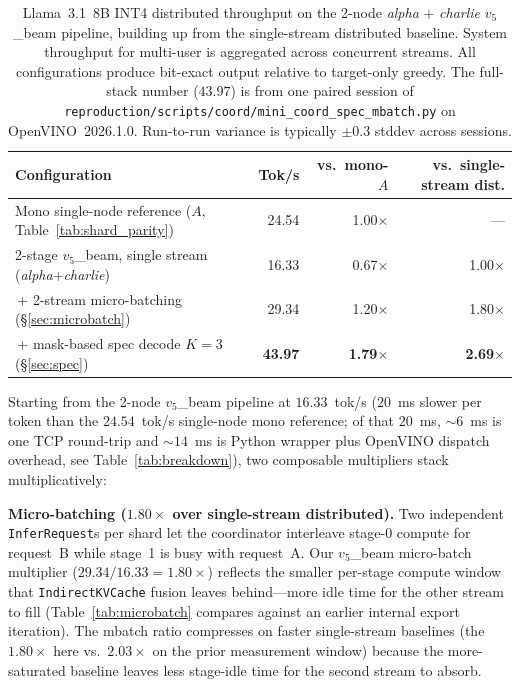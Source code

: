 \documentclass[11pt]{article}
\newcommand{\brk}{\discretionary{}{}{}}
\begin{document}
\begin{table}[ht]
\centering
\caption{Llama~3.1~8B INT4 distributed throughput on the 2-node \emph{alpha} + \emph{charlie} $v_5$\_beam pipeline, building up from the single-stream distributed baseline. System throughput for multi-user is aggregated across concurrent streams. All configurations produce bit-exact output relative to target-only greedy. The full-stack number ($43.97$) is from one paired session of \texttt{reproduction/\brk scripts/\brk coord/\brk mini\_\brk coord\_\brk spec\_\brk mbatch.py} on OpenVINO~2026.1.0. Run-to-run variance is typically $\pm 0.3$ stddev across sessions.}
\label{tab:progression}
\begin{tabular}{@{}lrrr@{}}
\toprule
Configuration & Tok/s & vs.\ mono-$A$ & vs.\ single-stream dist. \\
\midrule
Mono single-node reference ($A$, Table~\ref{tab:shard_parity}) & 24.54 & 1.00$\times$ & --- \\
2-stage $v_5$\_beam, single stream (\emph{alpha}+\emph{charlie}) & 16.33 & 0.67$\times$ & 1.00$\times$ \\
\,+ 2-stream micro-batching (\S\ref{sec:microbatch}) & 29.34 & 1.20$\times$ & 1.80$\times$ \\
\,+ mask-based spec decode $K\!=\!3$ (\S\ref{sec:spec}) & \textbf{43.97} & \textbf{1.79$\times$} & \textbf{2.69$\times$} \\
\bottomrule
\end{tabular}
\end{table}

Starting from the 2-node $v_5$\_beam pipeline at $16.33$~tok/s ($20$~ms slower per token than the $24.54$~tok/s single-node mono reference; of that $20$~ms, ${\sim}6$~ms is one TCP round-trip and ${\sim}14$~ms is Python wrapper plus OpenVINO dispatch overhead, see Table~\ref{tab:breakdown}), two composable multipliers stack multiplicatively:

\textbf{Micro-batching ($1.80\times$ over single-stream distributed).} Two independent \texttt{InferRequest}s per shard let the coordinator interleave stage-0 compute for request~B while stage~1 is busy with request~A. Our $v_5$\_beam micro-batch multiplier ($29.34 / 16.33 = 1.80\times$) reflects the smaller per-stage compute window that \texttt{Indirect\brk KVCache} fusion leaves behind---more idle time for the other stream to fill (Table~\ref{tab:microbatch} compares against an earlier internal export iteration). The mbatch ratio compresses on faster single-stream baselines (the $1.80\times$ here vs.\ $2.03\times$ on the prior measurement window) because the more-saturated baseline leaves less stage-idle time for the second stream to absorb.
\end{document}
